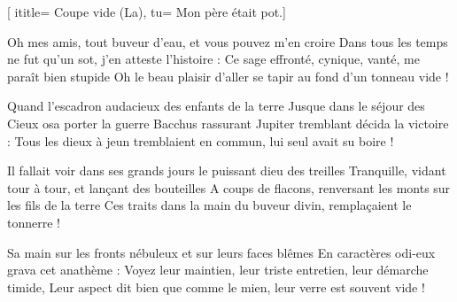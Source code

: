  [
ititle= {Coupe vide (La)},
tu= {Mon père était pot.}]


\beginverse
Oh mes amis, tout buveur d'eau, et vous pouvez m'en croire
Dans tous les temps ne fut qu'un sot, j'en atteste l'histoire :
Ce sage effronté, cynique, vanté, me paraît bien stupide
Oh le beau plaisir d'aller se tapir au fond d'un tonneau vide !
\endverse

\beginverse
Quand l'escadron audacieux des enfants de la terre
Jusque dans le séjour des Cieux osa porter la guerre
Bacchus rassurant Jupiter tremblant décida la victoire :
Tous les dieux à jeun tremblaient en commun, lui seul avait su boire !
\endverse

\beginverse
Il fallait voir dans ses grands jours le puissant dieu des treilles
Tranquille, vidant tour à tour, et lançant des bouteilles
A coups de flacons, renversant les monts sur les fils de la terre
Ces traits dans la main du buveur divin, remplaçaient le tonnerre !
\endverse

\beginverse
Sa main sur les fronts nébuleux et sur leurs faces blêmes
En caractères odi-eux grava cet anathème :
Voyez leur maintien, leur triste entretien, leur démarche timide,
Leur aspect dit bien que comme le mien, leur verre est souvent vide !
\endverse

\endsong